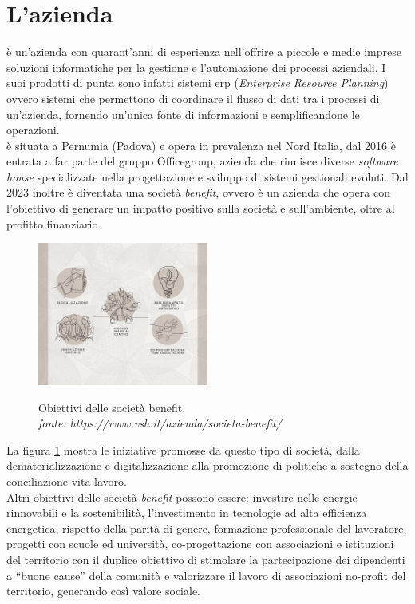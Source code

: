 \section{L'azienda}
{\company} è un'azienda con quarant'anni di esperienza nell'offrire a piccole e medie imprese soluzioni informatiche per la 
gestione e l'automazione dei processi aziendali. I suoi prodotti di punta sono infatti sistemi \gls{erp} (\textit{Enterprise 
Resource Planning}) ovvero sistemi che permettono di coordinare il flusso di dati tra i processi di un'azienda, fornendo un'unica fonte di 
informazioni e semplificandone le operazioni.\\
{\company} è situata a Pernumia (Padova) e opera in prevalenza nel Nord Italia, dal 2016 è entrata a far parte del gruppo Officegroup, azienda 
che riunisce diverse \textit{software house} specializzate nella progettazione e sviluppo di sistemi gestionali evoluti. 
Dal 2023 inoltre è diventata una società \textit{benefit}, ovvero è un azienda che opera con l'obiettivo di generare un impatto positivo 
sulla società e sull'ambiente, oltre al profitto finanziario.

\begin{figure}[H]
    \centering
    \includegraphics[alt={Obiettivi delle società benefit}, width=0.5\textwidth]{img/soc-benefit.jpg}
    \caption[Obiettivi delle società benefit.]{Obiettivi delle società benefit. \\ \textit{fonte: https://www.vsh.it/azienda/societa-benefit/}}
    \label{fig:società benefit}
\end{figure}

La figura \ref{fig:società benefit} mostra le iniziative promosse da questo tipo di società, dalla dematerializzazione 
e digitalizzazione alla promozione di politiche a sostegno della conciliazione vita-lavoro.\\
Altri obiettivi delle società \textit{benefit} possono essere: investire nelle energie rinnovabili e la sostenibilità, l'investimento in tecnologie 
ad alta efficienza energetica, rispetto della parità di genere, formazione professionale del lavoratore, progetti con scuole ed 
università, co-progettazione con associazioni e istituzioni del territorio con il duplice obiettivo di stimolare la partecipazione dei dipendenti 
a “buone cause” della comunità e valorizzare il lavoro di associazioni no-profit del territorio, generando così valore sociale.

